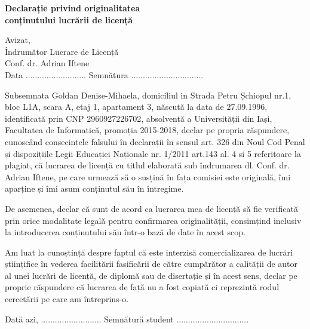\begin{center}
	\textbf{\large{Declarație privind originalitatea \\conținutului lucrării de licență}}
\end{center}
	
\begin{flushright}
	Avizat,\\
	Îndrumător Lucrare de Licență\\
	Conf. dr. Adrian Iftene\\
	Data \small{..........................} Semnătura \small{...............................}
\end{flushright}

Subsemnata Goldan Denise-Mihaela, domiciliul in Strada Petru  Șchiopul nr.1, bloc L1A, scara A, etaj 1, apartament 3, născută la data de 27.09.1996, identificată prin CNP 2960927226702, absolventă a Universității  din Iași, Facultatea de Informatică, promoția 2015-2018, declar pe propria răspundere, cunoscând consecințele falsului în declarații în sensul art. 326 din Noul Cod Penal și dispozițiile Legii Educației Naționale nr. 1/2011 art.143 al. 4 si 5 referitoare la plagiat, că lucrarea de licență cu titlul  elaborată sub îndrumarea dl. Conf. dr. Adrian Iftene, pe care urmează să o susțină în fața comisiei este originală, îmi aparține și îmi asum conținutul său în întregime.

De asemenea, declar că sunt de acord ca lucrarea mea de licență să fie verificată prin orice modalitate legală pentru confirmarea originalității, consimțind inclusiv la introducerea conținutului său într-o bază de date în acest scop.

Am luat la cunoștință despre faptul că este interzisă comercializarea de lucrări științifice în vederea facilitării fasificării de către cumpărător a calității de autor al unei lucrări de licență, de diplomă sau de disertație și în acest sens, declar pe proprie răspundere că lucrarea de față nu a fost copiată ci reprezintă rodul cercetării pe care am întreprins-o.

\hfill \break

Dată azi, \small{..........................} \hfill Semnătură student \small{...............................} \\

\clearpage
